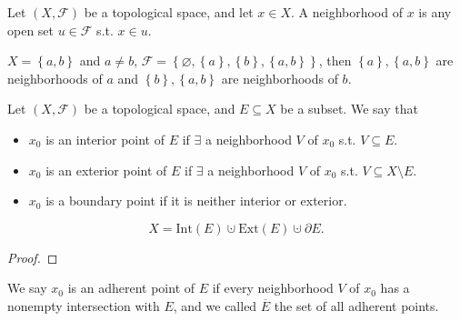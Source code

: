 \begin{definition}[Neighborhood] \label{def: neighborhood}
    Let \((X, \mathcal{F} )\) be a topological space, and let \(x \in X\). A neighborhood of \(x\) is any open set \(u \in \mathcal{F} \) s.t. \(x \in u\).     
\end{definition}

\begin{eg}
    \(X = \left\{ a, b \right\} \) and \(a \neq b\), \(\mathcal{F} = \left\{ \varnothing , \left\{ a \right\}, \left\{ b \right\}, \left\{ a, b \right\}    \right\} \), then \(\left\{ a \right\}, \left\{ a, b \right\}  \) are neighborhoods of \(a\) and \(\left\{ b \right\}, \left\{ a, b \right\}  \) are neighborhoods of \(b\).      
\end{eg}

\begin{definition}
    Let \((X, \mathcal{F} )\) be a topological space, and \(E \subseteq X\) be a subset. We say that 
    \begin{itemize}
        \item \(x_0\) is an interior point of \(E\) if \(\exists \) a neighborhood \(V\) of \(x_0\) s.t. \(V \subseteq E\). 
        \item \(x_0\) is an exterior point of \(E\) if \(\exists \) a neighborhood \(V\) of \(x_0\) s.t. \(V \subseteq X \setminus E\). 
        \item \(x_0\) is a boundary point if it is neither interior or exterior.             
    \end{itemize}  
\end{definition}

\begin{corollary}
    \[
        X = \mathrm{Int}(E) \cupdot \mathrm{Ext}(E) \cupdot \partial E.  
    \]
\end{corollary}
\begin{proof}
\end{proof}

\begin{definition} \label{def: adherent point}
    We say \(x_0\) is an adherent point of \(E\) if every neighborhood \(V\) of \(x_0\) has a nonempty intersection with \(E\), and we called \(\overline{E} \) the set of all adherent points.     
\end{definition}

